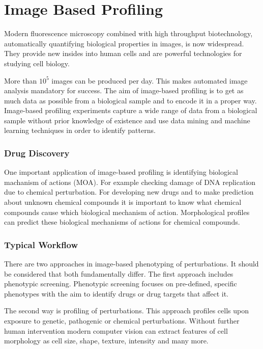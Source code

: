\chapter{Image Based Profiling}

Modern fluorescence microscopy combined with high throughput biotechnology, automatically quantifying biological properties in images, is now widespread. They provide new insides into human cells and are powerful technologies for studying cell biology. 

More than  $10^{5}$ images can be produced per day. This makes automated image analysis mandatory for success. The aim of image-based profiling is to get as much data as possible from a biological sample and to encode it in a proper way. Image-based profiling experiments capture a wide range of data from a biological sample without prior knowledge of existence and use data mining and machine learning techniques in order to identify patterns.


\subsection{Drug Discovery}

One important application of image-based profiling is identifying biological machanism of actions (MOA). For example checking damage of DNA replication due to chemical perturbation. For developing new drugs and to make prediction about unknown chemical compounds it is important to know what chemical compounds cause which biological mechanism of action. Morphological profiles can predict these biological mechanisms of actions for chemical compounds.

\subsection{Typical Workflow}

There are two approaches in image-based phenotyping of perturbations. 
It should be considered that both fundamentally differ. The first approach includes phenotypic screening. Phenotypic screening focuses on pre-defined, specific phenotypes with the aim to identify drugs or drug targets that affect it.

The second way is profiling of perturbations. This approach profiles cells upon exposure to genetic, pathogenic or chemical perturbations.
Without further human intervention modern computer vision can extract features of cell morphology as cell size, shape, texture, intensity and many more.

